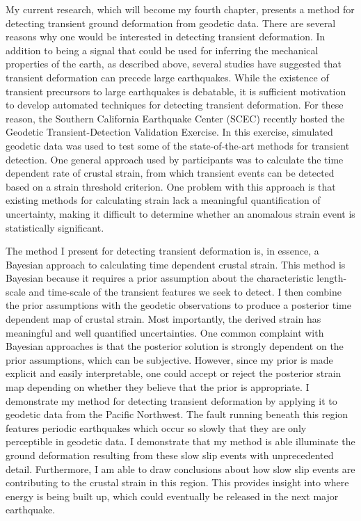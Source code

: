 My current research, which will become my fourth chapter, presents a method for detecting transient ground deformation from geodetic data.  There are several reasons why one would be interested in detecting transient deformation.  In addition to being a signal that could be used for inferring the mechanical properties of the earth, as described above, several studies have suggested that transient deformation can precede large earthquakes.  While the existence of transient precursors to large earthquakes is debatable, it is sufficient motivation to develop automated techniques for detecting transient deformation.  For these reason, the Southern California Earthquake Center (SCEC) recently hosted the Geodetic Transient-Detection Validation Exercise. In this exercise, simulated geodetic data was used to test some of the state-of-the-art methods for transient detection.  One general approach used by participants was to calculate the time dependent rate of crustal strain, from which transient events can be detected based on a strain threshold criterion.  One problem with this approach is that existing methods for calculating strain lack a meaningful quantification of uncertainty, making it difficult to determine whether an anomalous strain event is statistically significant.  

The method I present for detecting transient deformation is, in essence, a Bayesian approach to calculating time dependent crustal strain.  This method is Bayesian because it requires a prior assumption about the characteristic length-scale and time-scale of the transient features we seek to detect. I then combine the prior assumptions with the geodetic observations to produce a posterior time dependent map of crustal strain.  Most importantly, the derived strain has meaningful and well quantified uncertainties.  One common complaint with Bayesian approaches is that the posterior solution is strongly dependent on the prior assumptions, which can be subjective.  However, since my prior is made explicit and easily interpretable, one could accept or reject the posterior strain map depending on whether they believe that the prior is appropriate.  I demonstrate my method for detecting transient deformation by applying it to geodetic data from the Pacific Northwest.  The fault running beneath this region features periodic earthquakes which occur so slowly that they are only perceptible in geodetic data.  I demonstrate that my method is able illuminate the ground deformation resulting from these slow slip events with unprecedented detail. Furthermore, I am able to draw conclusions about how slow slip events are contributing to the crustal strain in this region. This provides insight into where energy is being built up, which could eventually be released in the next major earthquake.     

